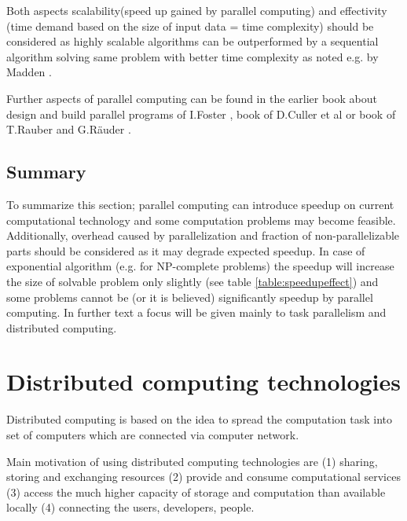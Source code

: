 Both aspects scalability(speed up gained by parallel computing) and effectivity (time demand based on the size of input data = time complexity) should be considered as highly scalable algorithms can be outperformed by a sequential algorithm solving same problem with better time complexity as noted e.g. by Madden \cite{Madden2012}. 

Further aspects of parallel computing can be found in the earlier book about design and build parallel programs of I.Foster \cite{Foster1995}, book of D.Culler et al  \cite{Culer1998} or book of T.Rauber and G.Räuder \cite{Rauber2013}. 

\subsection{Summary}

To summarize this section; parallel computing can introduce speedup on current computational technology and some computation problems may become feasible.
Additionally, overhead caused by parallelization and fraction of non-parallelizable parts should be considered as it may degrade expected speedup.
In case of exponential algorithm (e.g. for NP-complete problems) the speedup will increase the size of solvable problem only slightly (see table \ref{table:speedupeffect}) and some problems cannot be (or it is believed) significantly speedup by parallel computing. 
In further text a focus will be given mainly to task parallelism and distributed computing. 

\section{Distributed computing technologies}
\label{sec:distributed}

Distributed computing is based on the idea to spread the computation task into set of computers which are connected via computer network.

Main motivation of using distributed computing technologies are (1) sharing, storing and exchanging resources (2) provide and consume computational services (3) access the much higher capacity of storage and computation than available locally (4) connecting the users, developers, people.

